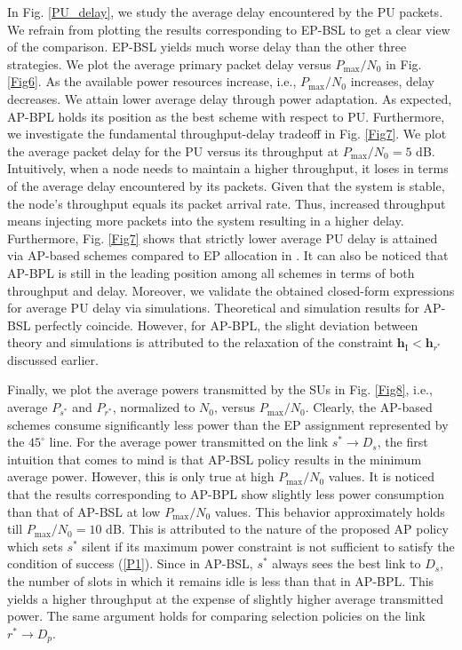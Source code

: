 \documentclass[journal,twocolumn]{IEEEtran}
\begin{document}
In Fig. \ref{PU_delay}, we study the average delay encountered by the PU packets. We refrain from plotting the results corresponding to EP-BSL to get a clear view of the comparison. EP-BSL yields much worse delay than the other three strategies. We plot the average primary packet delay versus $P_{\mathrm{max}}/N_{0}$ in Fig. \ref{Fig6}. As the available power resources increase, i.e., $P_{\mathrm{max}}/N_{0}$ increases, delay decreases. We attain lower average delay through power adaptation. As expected, AP-BPL holds its position as the best scheme with respect to PU. Furthermore, we investigate the fundamental throughput-delay tradeoff in Fig. \ref{Fig7}. We plot the average packet delay for the PU versus its throughput at $P_{\mathrm{max}}/N_{0}=5$ dB. Intuitively, when a node needs to maintain a higher throughput, it loses in terms of the average delay encountered by its packets. Given that the system is stable, the node's throughput equals its packet arrival rate. Thus, increased throughput means injecting more packets into the system resulting in a higher delay. Furthermore, Fig. \ref{Fig7} shows that strictly lower average PU delay is attained via AP-based schemes compared to EP allocation in \cite{Krikidis}. It can also be noticed that AP-BPL is still in the leading position among all schemes in terms of both throughput and delay. Moreover, we validate the obtained closed-form expressions for average PU delay via simulations. Theoretical and simulation results for AP-BSL perfectly coincide. However, for AP-BPL, the slight deviation between theory and simulations is attributed to the relaxation of the constraint $\mathbf{h}_{\mathrm{I}} < \mathbf{h}_{r^*}$ discussed earlier.

Finally, we plot the average powers transmitted by the SUs in Fig. \ref{Fig8}, i.e., average $P_{s^*}$ and $P_{r^*}$, normalized to $N_{0}$, versus $P_{\mathrm{max}}/N_{0}$. Clearly, the AP-based schemes consume significantly less power than the EP assignment represented by the $45^ \circ$ line. For
the average power transmitted on the link $s^* \rightarrow D_s$, the first intuition that comes to mind is that AP-BSL policy results in the minimum average power. However, this is only true at high $P_{\mathrm{max}}/N_{0}$ values. It is noticed that the results corresponding to AP-BPL show
slightly less power consumption than that of AP-BSL at low $P_{\mathrm{max}}/N_{0}$ values. This behavior approximately holds till $P_{\mathrm{max}}/N_0=10$ dB. This is attributed to the nature of the proposed AP policy which sets $s^*$ silent if its maximum power constraint is not sufficient to satisfy the condition of success (\ref{P1}). Since in AP-BSL, $s^*$ always sees the best link to $D_{s}$, the number of slots in which it remains idle is less than that in AP-BPL. This yields a higher throughput at the expense of slightly higher average transmitted power. The same argument holds for comparing selection policies on the link $r^* \rightarrow D_p$.
\end{document}
